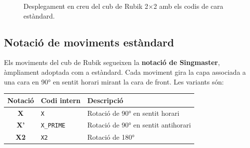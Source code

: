 \documentclass[12pt, a4paper]{article}
\begin{document}
\begin{figure}[H]
  \centering
  \caption{Desplegament en creu del cub de Rubik 2$\times$2 amb els codis de cara estàndard.}
  \label{fig:cube_net}
\end{figure}

\subsection{Notació de moviments estàndard}

Els moviments del cub de Rubik segueixen la \textbf{notació de Singmaster}, àmpliament adoptada com a estàndard. Cada moviment gira la capa associada a una cara en 90° en sentit horari mirant la cara de front. Les variants són:

\begin{center}
\begin{tabular}{cll}
  \toprule
  \textbf{Notació} & \textbf{Codi intern} & \textbf{Descripció} \\
  \midrule
  \textbf{X}   & \texttt{X}       & Rotació de 90° en sentit horari \\
  \textbf{X'}  & \texttt{X\_PRIME} & Rotació de 90° en sentit antihorari \\
  \textbf{X2}  & \texttt{X2}      & Rotació de 180° \\
  \bottomrule
\end{tabular}
\end{center}
\end{document}
